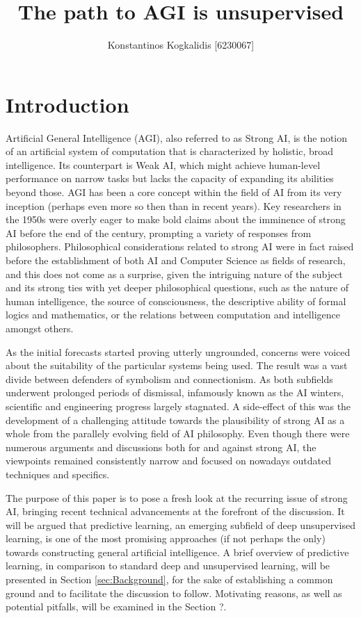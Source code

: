 \documentclass[]{article}
\begin{document}
\author{Konstantinos Kogkalidis [6230067]}
\title{The path to AGI is unsupervised}
\maketitle

\section{Introduction}
Artificial General Intelligence (AGI), also referred to as Strong AI, is the notion of an artificial  system of computation that is characterized by holistic, broad intelligence. Its counterpart is Weak AI, which might achieve human-level performance on narrow tasks but lacks the capacity of expanding its abilities beyond those. AGI has been a core concept within the field of AI from its very inception (perhaps even more so then than in recent years). Key researchers in the 1950s were overly eager to make bold claims about the imminence of strong AI before the end of the century, prompting a variety of responses from philosophers. Philosophical considerations related to strong AI were in fact raised before the establishment of both AI and Computer Science as fields of research, and this does not come as a surprise, given the intriguing nature of the subject and its strong ties with yet deeper philosophical questions, such as the nature of human intelligence, the source of consciousness, the descriptive ability of formal logics and mathematics, or the relations between computation and intelligence amongst others.

As the initial forecasts started proving utterly ungrounded, concerns were voiced about the suitability of the particular systems being used. The result was a vast divide between defenders of symbolism and connectionism. As both subfields underwent prolonged periods of dismissal, infamously known as the AI winters, scientific and engineering progress largely stagnated. A side-effect of this was the development of a challenging attitude towards the plausibility of strong AI as a whole from the parallely evolving field of AI philosophy. Even though there were numerous arguments and discussions both for and against strong AI, the viewpoints remained consistently narrow and focused on nowadays outdated techniques and specifics. 

The purpose of this paper is to pose a fresh look at the recurring issue of strong AI, bringing recent technical advancements at the forefront of the discussion. It will be argued that predictive learning, an emerging subfield of deep unsupervised learning, is one of the most promising approaches (if not perhaps the only) towards constructing general artificial intelligence. A brief overview of predictive learning, in comparison to standard deep and unsupervised learning, will be presented in Section \ref{sec:Background}, for the sake of establishing a common ground and to facilitate the discussion to follow. Motivating reasons, as well as potential pitfalls, will be examined in the Section {?}.
\end{document}
